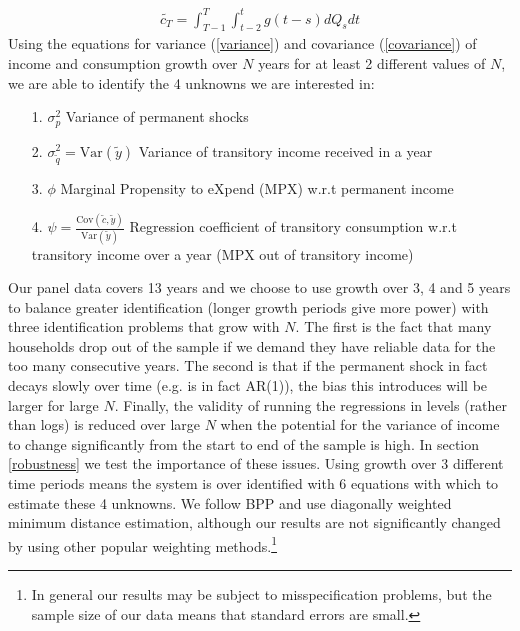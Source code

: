 \documentclass[titlepage]{\econtex}\newcommand{\texname}{ConsumptionHeterogeneity}
\begin{document}
\begin{align}
\tilde{c_T} = \int_{T-1}^{T}\int_{t-2}^{t} g(t-s)dQ_s dt \label{tot_cons}
\end{align}
Using the equations for variance (\ref{variance}) and covariance (\ref{covariance}) of income and consumption growth over $N$ years for at least 2 different values of $N$, we are able to identify the 4 unknowns we are interested in:
	\begin{itemize}
	\item[1.] $\sigma^2_p$ Variance of permanent shocks
	\item[2.] $\sigma^2_{\tilde{q}} = \mathrm{Var}(\tilde{y})$ Variance of transitory income received in a year
	\item[3.] $\phi$ Marginal Propensity to eXpend (MPX) w.r.t permanent income
	\item[4.] $\psi = \frac{\mathrm{Cov}(\tilde{c},\tilde{y})}{\mathrm{Var}(\tilde{y})}$ Regression coefficient of transitory consumption w.r.t transitory income over a year (MPX out of transitory income)
\end{itemize}
Our panel data covers 13 years and we choose to use growth over 3, 4 and 5 years to balance greater identification (longer growth periods give more power) with three identification problems that grow with $N$. The first is the fact that many households drop out of the sample if we demand they have reliable data for the too many consecutive years. The second is that if the permanent shock in fact decays slowly over time (e.g. is in fact AR(1)), the bias this introduces will be larger for large $N$. Finally, the validity of running the regressions in levels (rather than logs) is reduced over large $N$ when the potential for the variance of income to change significantly from the start to end of the sample is high. In section \ref{robustness} we test the importance of these issues. Using growth over 3 different time periods means the system is over identified with 6 equations with which to estimate these 4 unknowns. We follow BPP and use diagonally weighted minimum distance estimation, although our results are not significantly changed by using other popular weighting methods.\footnote{In general our results may be subject to misspecification problems, but the sample size of our data means that standard errors are small.}
\end{document}
